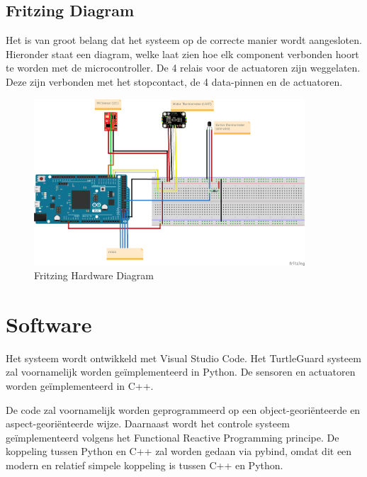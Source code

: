\documentclass[a4paper]{report}
\newcommand{\turtleguard}{\mbox{TurtleGuard\texttrademark}\xspace}
\begin{document}
\subsection{Fritzing Diagram}
Het is van groot belang dat het systeem op de correcte manier wordt aangesloten. Hieronder staat een diagram, welke laat zien hoe elk component verbonden hoort te worden met de microcontroller.
De 4 relais voor de actuatoren zijn weggelaten. Deze zijn verbonden met het stopcontact, de 4 data-pinnen en de actuatoren.
\begin{figure}[h]
  \centering
  \includegraphics[width=0.9\textwidth]{Images/hardware_sketch_fritzing.png}
  \caption{Fritzing Hardware Diagram}
  \label{fig:hardware_sketch_fritzing}
\end{figure}


\section{Software}
Het systeem wordt ontwikkeld met Visual Studio Code. Het \turtleguard systeem zal voornamelijk worden geïmplementeerd in Python. De sensoren en actuatoren worden geïmplementeerd in C++.

De code zal voornamelijk worden geprogrammeerd op een object-georiënteerde en aspect-georiënteerde wijze. 
Daarnaast wordt het controle systeem geïmplementeerd volgens het Functional Reactive Programming principe.
De koppeling tussen Python en C++ zal worden gedaan via pybind, omdat dit een modern en relatief simpele koppeling is tussen C++ en Python.
\end{document}
